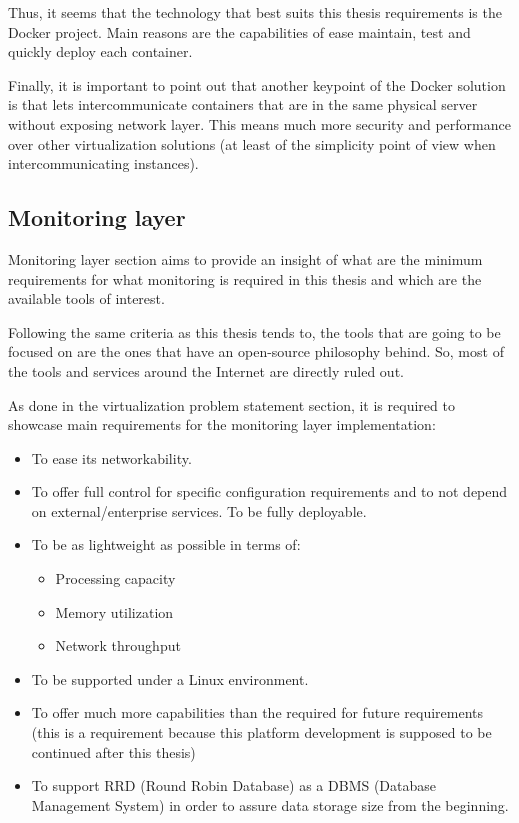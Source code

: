 Thus, it seems that the technology that best suits this thesis requirements is the Docker project. Main reasons are the capabilities of ease maintain, test and quickly deploy each container. 

Finally, it is important to point out that another keypoint of the Docker solution is that lets intercommunicate containers that are in the same physical server without exposing network layer. This means much more security and performance over other virtualization solutions (at least of the simplicity point of view when intercommunicating instances).

\subsection{Monitoring layer}

Monitoring layer section aims to provide an insight of what are the minimum requirements for what monitoring is required in this thesis and which are the available tools of interest.

Following the same criteria as this thesis tends to, the tools that are going to be focused on are the ones that have an open-source philosophy behind. So, most of the tools and services around the Internet are directly ruled out.

As done in the virtualization problem statement section, it is required to showcase main requirements for the monitoring layer implementation:

\begin{itemize}
\item To ease its networkability.
\item To offer full control for specific configuration requirements and to not depend on external/enterprise services. To be fully deployable.
\item To be as lightweight as possible in terms of:
\begin{itemize}
\item Processing capacity
\item Memory utilization
\item Network throughput
\end{itemize}
\item To be supported under a Linux environment.
\item To offer much more capabilities than the required for future requirements (this is a requirement because this platform development is supposed to be continued after this thesis)
\item To support RRD (Round Robin Database) as a DBMS (Database Management System) in order to assure data storage size from the beginning.
\end{itemize}


